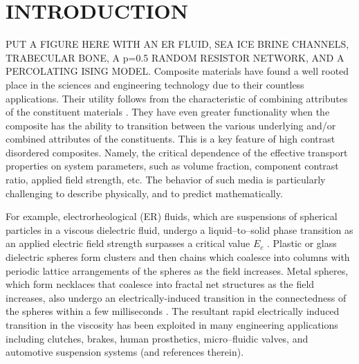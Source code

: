\documentclass[english,12pt]{ttuthes}
\begin{document}
\chapter{INTRODUCTION}
\setcounter{equation}{0}
%
PUT A FIGURE HERE WITH AN ER FLUID, SEA ICE BRINE CHANNELS, TRABECULAR
BONE, A p=0.5 RANDOM RESISTOR NETWORK, AND A PERCOLATING ISING MODEL.
Composite materials have found a well rooted place in the sciences and
engineering technology due to their countless applications. Their
utility follows from the characteristic of combining
attributes of the constituent materials \cite{MILTON:2002:TC}. They
have even greater functionality when the composite has the ability to
transition between the various underlying and/or combined attributes
of the constituents. This is a key feature of high contrast disordered  
composites. Namely, the critical dependence of the effective transport
properties on system parameters, such as volume fraction, component
contrast ratio, applied field strength, etc. The behavior of such
media is particularly challenging to describe physically, and to
predict mathematically. 

For example, electrorheological (ER) fluids, which are suspensions of
spherical particles in a viscous dielectric fluid, undergo a
liquid--to--solid phase transition as an applied electric field
strength surpasses a critical value $E_c$
\cite{Halsey:S-761,Tao-EF,Wen:APL-2147,Wen:PF-1826}. Plastic or glass
dielectric spheres form clusters and then chains which coalesce into
columns with periodic lattice arrangements of the spheres as the field
increases. Metal spheres, which form necklaces that coalesce into
fractal net structures as the field increases, also undergo an
electrically-induced transition in the connectedness of the spheres
within a few milliseconds \cite{Wen:SoftMatter-200}. The resultant
rapid electrically induced transition in the viscosity has been
exploited in many engineering applications including clutches, brakes,
human prosthetics, micro--fluidic valves, and automotive suspension
systems \cite{Wen:SoftMatter-200} (and references therein).  
\end{document}

